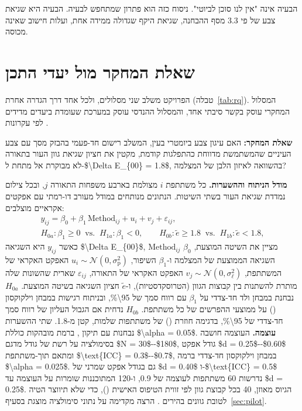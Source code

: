 \begin{warningbox}
הבעיה אינה "אין לנו סוכן  לביוטי". ניסוח כזה הוא פתרון שמתחפש לבעיה. הבעיה היא שגיאת צבע של פי \num{3.3} מסף ההבחנה, שגיאת היקף שגדולה ממידה אחת, ועלות חישוב שאינה מכוסה.
\end{warningbox}

\section{שאלת המחקר מול יעדי התכן}
\label{sec:rq}

הפרויקט משלב שני מסלולים, ולכל אחד דרך הגדרה אחרת (טבלה~\ref{tab:rq}). המסלול המחקרי עוסק בקשר סיבתי אחד, והמסלול ההנדסי עוסק במערכת שעומדת ביעדים מדידים לפי עקרונות  \cite{doran1981smart}.

\textbf{שאלת המחקר:} האם עיגון צבע ביומטרי בעין, המשלב רישום חד-פעמי בהבזק מסך עם צבע העיניים שהמשתמשת מדווחת כהתפלגות קודמת, מקטין את חציון שגיאת גוון העור בתאורה לא מבוקרת אל מתחת ל-\num{$\Delta E_{00} = 1.8$}, בהשוואה לאיזון הלבן של המצלמה?

\textbf{מודל הניתוח וההשערות.} כל משתתפת $i$ מצולמת בארבע משפחות התאורה $j$, ובכל צילום נמדדת שגיאת העור בשתי השיטות. הנתונים מנותחים במודל מעורב דו-רמתי עם אפקטים אקראיים מוצלבים:
\begin{equation}
\begin{gathered}
y_{ij} = \beta_0 + \beta_1\, \mathrm{Method}_{ij} + u_i + v_j + \varepsilon_{ij}, \\
H_{0a}\colon \beta_1 \ge 0 \;\; \mathrm{vs.} \;\; H_{1a}\colon \beta_1 < 0, \qquad
H_{0b}\colon \tilde{e} \ge 1.8 \;\; \mathrm{vs.} \;\; H_{1b}\colon \tilde{e} < 1.8,
\end{gathered}
\label{eq:hyp}
\end{equation}
כאשר $y_{ij}$ היא השגיאה \num{$\Delta E_{00}$}, $\text{Method}_{ij}$ מציין את השיטה המוצעת, $\beta_0$ השגיאה הממוצעת של המצלמה ו-$\beta_1$ השיפור, $u_i \sim \mathcal{N}(0, \sigma^2_{\text{p}})$ האפקט האקראי של המשתתפת, $v_j \sim \mathcal{N}(0, \sigma^2_{\ell})$ האפקט האקראי של התאורה, $\varepsilon_{ij}$ שארית שהשונות שלה מותרת להשתנות בין קבוצות הגוון (הטרוסקדסטיות), ו-$\tilde{e}$ חציון השגיאה בשיטה המוצעת. $H_{0a}$ נבחנת במבחן ולד חד-צדדי על $\beta_1$ עם רווח סמך של \num{95\%}, ובניתוח רגישות במבחן וילקוקסון () על ממוצעי ההפרשים של כל משתתפת. $H_{0b}$ נדחית אם הגבול העליון של רווח סמך חד-צדדי של \num{95\%}, בדגימה חוזרת () של משתתפות שלמות, קטן מ-\num{1.8}. שתי ההשערות נבחנות עם תיקון , ברמת מובהקות כוללת \num{$\alpha = 0.05$}.
\textbf{עוצמה.} העוצמה חושבה בסימולציה על רשת של גודל מדגם \num{$N = 30$--$180$}, גודל אפקט \num{$d = 0.25$--$0.60$} ומתאם תוך-משתתפת \num{$\text{ICC} = 0.3$--$0.7$}, במבחן וילקוקסון חד-צדדי ברמה \num{$\alpha = 0.025$}. גם בגודל אפקט שמרני של \num{$d = 0.40$} ו-\num{$\text{ICC} = 0.5$} נדרשות \num{60} משתתפות לעוצמה של \num{0.9}, ו-\num{120} המתוכננות שומרות על העוצמה עד \num{$d = 0.25$}. הגיוס מאוזן, \num{40} בכל קבוצת גוון לפי זווית הטיפוס האישית (), כדי שלא תיווצר הטיה לטובת גוונים בהירים \cite{thong2023skin}. הרצה מקדימה על נתוני סימולציה מוצגת בסעיף~\ref{sec:pilot}.

